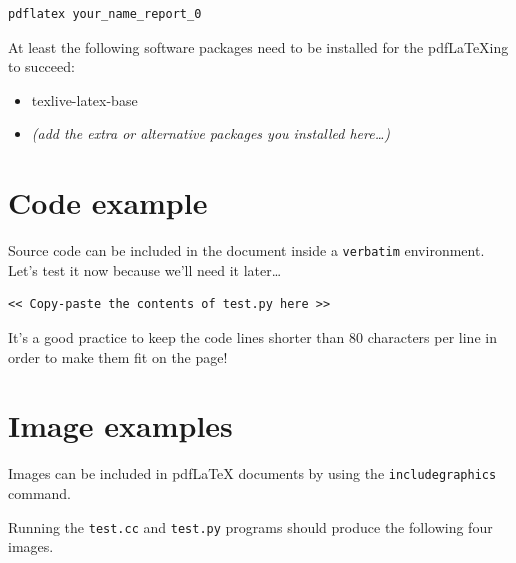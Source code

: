 \documentclass{article}
\begin{document}
\begin{verbatim}
pdflatex your_name_report_0
\end{verbatim}

At least the following software packages need to be installed for the
pdf\LaTeX{}ing to succeed:

\begin{itemize}
\item texlive-latex-base
\item \emph{(add the extra or alternative packages you installed here\ldots)}
\end{itemize}


\section{Code example}
\label{sec:code}

Source code can be included in the document inside a \texttt{verbatim}
environment.  Let's test it now because we'll need it later\ldots

\begin{verbatim}
<< Copy-paste the contents of test.py here >>
\end{verbatim}

It's a good practice to keep the code lines shorter than 80 characters
per line in order to make them fit on the page!

\section{Image examples}
\label{sec:images}

Images can be included in pdf\LaTeX{} documents by using the
\texttt{includegraphics} command.

Running the \texttt{test.cc} and \texttt{test.py} programs should
produce the following four images.

\bigskip
\noindent%
\setlength{\fboxsep}{0pt}%

\bigskip
\noindent%
\end{document}
